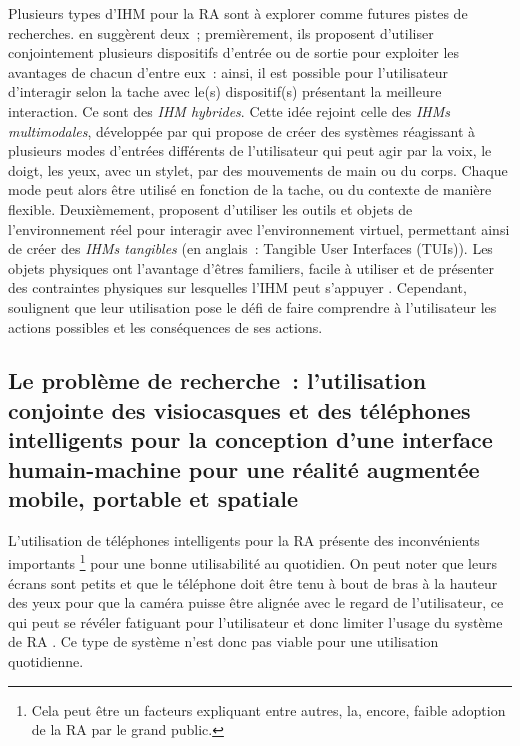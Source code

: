Plusieurs types d'IHM pour la RA sont à explorer comme futures pistes de recherches. \citet{AzumaBaillotBehringerEtAl2001} en suggèrent deux~; premièrement, ils proposent d'utiliser conjointement plusieurs dispositifs d'entrée ou de sortie pour exploiter les avantages de chacun d'entre eux~: ainsi, il est possible pour l'utilisateur d'interagir selon la tache avec le(s) dispositif(s) présentant la meilleure interaction. Ce sont des \emph{IHM hybrides}. \citep{ZhouDuhBillinghurst2008}  Cette idée rejoint celle des \emph{IHMs multimodales}, développée par \citet{Oviatt2003} qui propose de créer des systèmes réagissant à plusieurs modes d'entrées différents de l'utilisateur qui peut agir par la voix, le doigt, les yeux, avec un stylet, par des mouvements de main ou du corps. Chaque mode peut alors être utilisé en fonction de la tache, ou du contexte de manière flexible. \citep{CarmignianiFurhtAnisettiEtAl2011} Deuxièmement, \citet{AzumaBaillotBehringerEtAl2001} proposent d'utiliser les outils et objets de l'environnement réel pour interagir avec l'environnement virtuel, permettant ainsi de créer des \emph{IHMs tangibles} (en anglais~: \foreignlanguage{english}{Tangible User Interfaces (TUIs)}). Les objets physiques ont l'avantage d'êtres familiers, facile à utiliser et de présenter des contraintes physiques sur lesquelles l'IHM peut s'appuyer \citep{ZhouDuhBillinghurst2008}. Cependant, \citeauthor{ZhouDuhBillinghurst2008} soulignent que leur utilisation pose le défi de faire comprendre à l'utilisateur les actions possibles et les conséquences de ses actions. 


\subsection*{Le problème de recherche~: l'utilisation conjointe des visiocasques et des téléphones intelligents pour la conception d'une interface humain-machine pour une réalité augmentée mobile, portable et spatiale}
L'utilisation de téléphones intelligents pour la RA présente des inconvénients importants \footnote{Cela peut être un facteurs expliquant entre autres, la, encore, faible adoption de la RA par le grand public.} pour une bonne utilisabilité au quotidien. On peut noter que leurs écrans sont petits \citep{DeSaChurchill2013} et que le téléphone doit être tenu à bout de bras à la hauteur des yeux pour que la caméra puisse être alignée avec le regard de l'utilisateur, ce qui peut se révéler fatiguant pour l'utilisateur et donc limiter l'usage du système de RA \citep{Hincapie-RamosGuoMoghadasianEtAl2014}. Ce type de système n'est donc pas viable pour une utilisation quotidienne.


